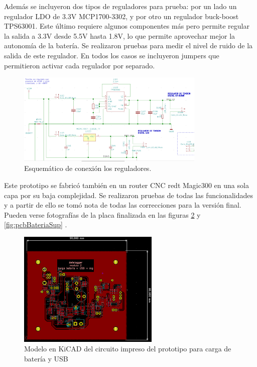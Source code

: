 Además se incluyeron dos tipos de reguladores para prueba: por un lado un regulador LDO de 3.3V MCP1700-3302, y por otro un regulador buck-boost TPS63001. Este último requiere algunos componentes más pero permite regular la salida a 3.3V desde 5.5V hasta 1.8V, lo que permite aprovechar mejor la autonomía de la batería. Se realizaron pruebas para medir el nivel de ruido de la salida de este regulador. En todos los casos se incluyeron jumpers que permitieron activar cada regulador por separado.

\begin{figure}[!htbp]
	\centering
	\includegraphics[width=0.8\textwidth]{./Figures/reguladores.png}			
	\caption{Esquemático de conexión los reguladores.}
	\label{fig:reguladores}
\end{figure}

Este prototipo se fabricó también en un router CNC redt Magic300 en una sola capa por su baja complejidad. Se realizaron pruebas de todas las funcionalidades y a partir de ello se tomó nota de todas las correcciones para la versión final. Pueden verse fotografías de la placa finalizada en las figuras \ref{fig:pcbBateriaInf} y \ref{fig:pcbBateriaSup} .

\begin{figure}[!htbp]
	\centering	
	\includegraphics[width=0.6\textwidth]{./Figures/pcbBateriaInf.png}			
	\caption{Modelo en KiCAD del circuito impreso del prototipo para carga de batería y USB}
	\label{fig:pcbBateriaInf}
\end{figure}

